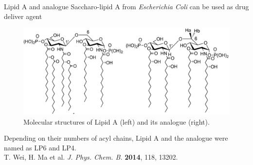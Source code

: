 \documentclass{beamer}
\begin{document}
\begin{frame}{Lipid A and analogue}
	Saccharo-lipid A from \emph{Escherichia Coli} can be used as drug deliver agent
	\begin{figure}
		\centering
		\includegraphics[width=\linewidth]{Pics/Lipid_stru.png}
		\caption{Molecular structures of Lipid A (left) and its analogue (right).}
	\end{figure}
	Depending on their numbers of acyl chains, Lipid A and the analogue were named as LP6 and LP4. \\
	
	\hfill {\tiny T. Wei, H. Ma et al. \emph{J. Phys. Chem. B.} \textbf{2014}, 118, 13202.
}
\end{frame}
\end{document}
